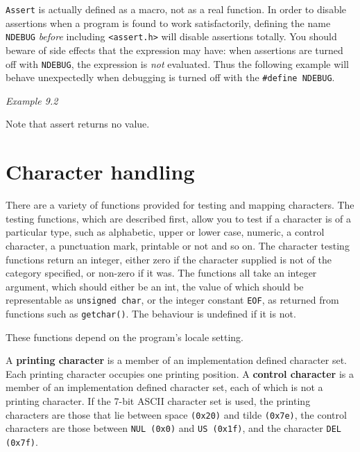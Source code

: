   \texttt{Assert} is actually  defined  as  a  macro,  not  as  a  real
   function.  In  order to disable assertions when a program is
   found to  work  satisfactorily,  defining  the  name  \texttt{NDEBUG}
   \textit{before} including \texttt{<assert.h>} will disable
   assertions totally.
   You should beware of side effects that  the  expression  may
   have:  when  assertions  are  turned  off  with  \texttt{NDEBUG}, the
   expression is \textit{not} evaluated. Thus the following example will
   behave  unexpectedly  when  debugging is turned off with the
   \texttt{\#define NDEBUG}.


  \begin{center}\textit{Example 9.2}\end{center}


  Note that assert returns no value.


 
        \section{Character handling}
        

  

  There are a variety of functions provided for testing and
   mapping characters.  The testing functions, which are
   described first, allow you to test if a character is of a
   particular type, such as alphabetic, upper or lower case,
   numeric, a control character, a punctuation mark, printable
   or not and so on.  The character testing functions return an
   integer, either zero if the character supplied is not of the
   category specified, or non-zero if it was.  The functions
   all take an integer argument, which should either be an int,
   the value of which should be representable as \texttt{unsigned char},
   or the integer constant \texttt{EOF}, as returned from functions such
   as \texttt{getchar()}.  The behaviour is undefined if it is not.


  These functions depend on the program's locale setting.


  A \textbf{printing character} is a member of an implementation
   defined character set.  Each printing character occupies one
   printing position.  A \textbf{control character} is a member of an
   implementation defined character set, each of which is not a
   printing character.  If the 7-bit ASCII character set is used, the printing
   characters are those that lie between space \texttt{(0x20)} and tilde
   \texttt{(0x7e)}, the control characters are
   those between \texttt{NUL (0x0)} and \texttt{US (0x1f)},
   and the character \texttt{DEL (0x7f)}.


